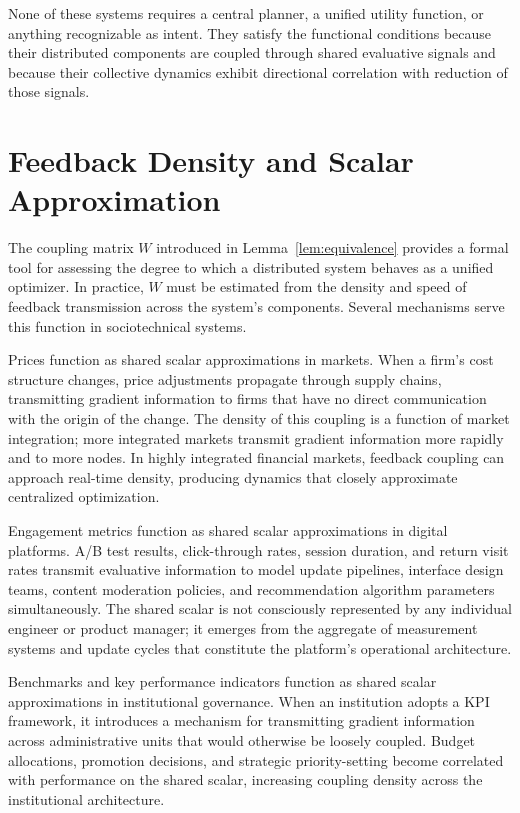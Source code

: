 \documentclass[12pt, oneside]{book}
\theoremstyle{plain}
\theoremstyle{definition}
\theoremstyle{remark}
\theoremstyle{definition}
\begin{document}
None of these systems requires a central planner, a unified utility function, or
anything recognizable as intent. They satisfy the functional conditions because their
distributed components are coupled through shared evaluative signals and because their
collective dynamics exhibit directional correlation with reduction of those signals.

\section{Feedback Density and Scalar Approximation}

The coupling matrix $W$ introduced in Lemma~\ref{lem:equivalence} provides a
formal tool for assessing the degree to which a distributed system behaves as a
unified optimizer. In practice, $W$ must be estimated from the density and speed of
feedback transmission across the system's components. Several mechanisms serve this
function in sociotechnical systems.

Prices function as shared scalar approximations in markets. When a firm's cost
structure changes, price adjustments propagate through supply chains, transmitting
gradient information to firms that have no direct communication with the origin of
the change. The density of this coupling is a function of market integration; more
integrated markets transmit gradient information more rapidly and to more nodes. In
highly integrated financial markets, feedback coupling can approach real-time density,
producing dynamics that closely approximate centralized optimization.

Engagement metrics function as shared scalar approximations in digital platforms.
A/B test results, click-through rates, session duration, and return visit rates
transmit evaluative information to model update pipelines, interface design teams,
content moderation policies, and recommendation algorithm parameters simultaneously.
The shared scalar is not consciously represented by any individual engineer or
product manager; it emerges from the aggregate of measurement systems and update
cycles that constitute the platform's operational architecture.

Benchmarks and key performance indicators function as shared scalar approximations
in institutional governance. When an institution adopts a KPI framework, it
introduces a mechanism for transmitting gradient information across administrative
units that would otherwise be loosely coupled. Budget allocations, promotion
decisions, and strategic priority-setting become correlated with performance on the
shared scalar, increasing coupling density across the institutional architecture.
\end{document}

